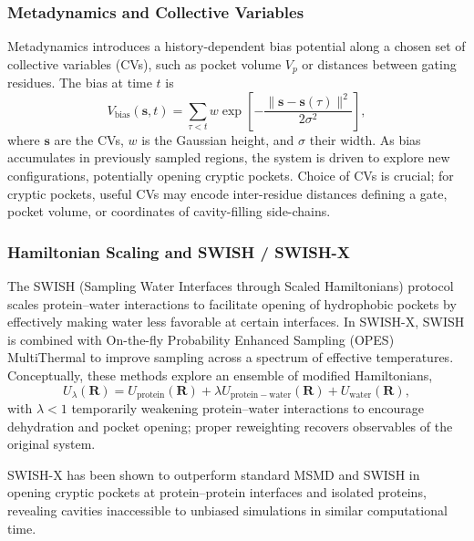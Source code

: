 \documentclass[12pt,a4paper]{article}
\begin{document}
\subsubsection{Metadynamics and Collective Variables}

Metadynamics introduces a history-dependent bias potential along a chosen set of collective variables (CVs), such as pocket volume \(V_p\) or distances between gating residues. The bias at time \(t\) is
\begin{equation}
V_{\mathrm{bias}}(\mathbf{s}, t) = \sum_{\tau < t} w \exp \left[ - \frac{\|\mathbf{s} - \mathbf{s}(\tau)\|^2}{2\sigma^2} \right],
\label{eq:metadynamics}
\end{equation}
where \(\mathbf{s}\) are the CVs, \(w\) is the Gaussian height, and \(\sigma\) their width. As bias accumulates in previously sampled regions, the system is driven to explore new configurations, potentially opening cryptic pockets.\cite{CH5_Kuzmanic2020} Choice of CVs is crucial; for cryptic pockets, useful CVs may encode inter-residue distances defining a gate, pocket volume, or coordinates of cavity-filling side-chains.\cite{CH5_Gasparikova2025}

\subsubsection{Hamiltonian Scaling and SWISH / SWISH-X}

The SWISH (Sampling Water Interfaces through Scaled Hamiltonians) protocol scales protein--water interactions to facilitate opening of hydrophobic pockets by effectively making water less favorable at certain interfaces.\cite{CH5_Kuzmanic2020} In SWISH-X, SWISH is combined with On-the-fly Probability Enhanced Sampling (OPES) MultiThermal to improve sampling across a spectrum of effective temperatures.\cite{CH5_Borsatto2024SWISHX} Conceptually, these methods explore an ensemble of modified Hamiltonians,
\begin{equation}
U_{\lambda}(\mathbf{R}) = U_{\mathrm{protein}}(\mathbf{R}) + \lambda U_{\mathrm{protein-water}}(\mathbf{R}) + U_{\mathrm{water}}(\mathbf{R}),
\end{equation}
with \(\lambda < 1\) temporarily weakening protein--water interactions to encourage dehydration and pocket opening; proper reweighting recovers observables of the original system.\cite{CH5_Borsatto2024SWISHX,CH5_zhang2026decrypting}

SWISH-X has been shown to outperform standard MSMD and SWISH in opening cryptic pockets at protein--protein interfaces and isolated proteins, revealing cavities inaccessible to unbiased simulations in similar computational time.\cite{CH5_Borsatto2024SWISHX}
\end{document}
